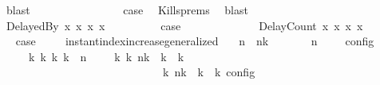 \begin{isabellebody}
\ blast\isanewline
\ \ \ \ \ \ \isamarkupfalse%
\isanewline
\ \ \ \ \ \ \isamarkupfalse%
\ \isamarkupfalse%
\ {\isacharquery}case\ \isamarkupfalse%
\ Kills{\isachardot}prems{\isacharparenleft}{}{\isacharparenright}\ \isamarkupfalse%
\ blast\isanewline
\ \ \ \ \isamarkupfalse%
\isanewline
\ \ \ \ \ \ \isamarkupfalse%
\ {\isacharparenleft}DelayedBy\ x{}\ x{}\ x{}\ x{}{\isacharparenright}\isanewline
\ \ \ \ \ \ \isamarkupfalse%
\ \isamarkupfalse%
\ {\isacharquery}case\ \isamarkupfalse%
\isanewline
\ \ \ \ \isamarkupfalse%
\isanewline
\ \ \ \ \ \ \isamarkupfalse%
\ {\isacharparenleft}DelayCount\ x{}\ x{}\ x{}\ x{}{\isacharparenright}\isanewline
\ \ \ \ \ \ \isamarkupfalse%
\ \isamarkupfalse%
\ {\isacharquery}case\ \isamarkupfalse%
\isanewline
\isanewline
\ \ \isamarkupfalse%
\isanewline
{}\isamarkupfalse%
%
\endisatagproof
{\isafoldproof}%
%
\isadelimproof
\isanewline
%
\endisadelimproof
\isanewline
{}\isamarkupfalse%
\ instant{\isacharunderscore}index{\isacharunderscore}increase{\isacharunderscore}generalized{\isacharcolon}\isanewline
\ \ \ {\isacartoucheopen}n\ {\isacharless}\ n\isactrlsub k{\isacartoucheclose}\isanewline
\ \ \ {\isacartoucheopen}{\isasymrho}\ {\isasymin}\ {\isasymlbrakk}\ {\isasymGamma}{\isacharcomma}\ n\ {\isasymturnstile}\ {\isasymPsi}\ {\isasymtriangleright}\ {\isasymPhi}\ {\isasymrbrakk}\isactrlsub c\isactrlsub o\isactrlsub n\isactrlsub f\isactrlsub i\isactrlsub g{\isacartoucheclose}\isanewline
\ \ \ \ \ {\isacartoucheopen}{\isasymexists}{\isasymGamma}\isactrlsub k\ {\isasymPsi}\isactrlsub k\ {\isasymPhi}\isactrlsub k\ k{\isachardot}\ {\isacharparenleft}{\isacharparenleft}{\isasymGamma}{\isacharcomma}\ n\ {\isasymturnstile}\ {\isasymPsi}\ {\isasymtriangleright}\ {\isasymPhi}{\isacharparenright}\ {\isasymhookrightarrow}\isactrlbsup k\isactrlesup \ {\isacharparenleft}{\isasymGamma}\isactrlsub k{\isacharcomma}\ n\isactrlsub k\ {\isasymturnstile}\ {\isasymPsi}\isactrlsub k\ {\isasymtriangleright}\ {\isasymPhi}\isactrlsub k{\isacharparenright}{\isacharparenright}\isanewline
\ \ \ \ \ \ \ \ \ \ \ \ \ \ \ \ \ \ \ \ \ \ \ \ \ {\isasymand}\ {\isasymrho}\ {\isasymin}\ {\isasymlbrakk}\ {\isasymGamma}\isactrlsub k{\isacharcomma}\ n\isactrlsub k\ {\isasymturnstile}\ {\isasymPsi}\isactrlsub k\ {\isasymtriangleright}\ {\isasymPhi}\isactrlsub k\ {\isasymrbrakk}\isactrlsub c\isactrlsub o\isactrlsub n\isactrlsub f\isactrlsub i\isactrlsub g{\isacartoucheclose}\isanewline

\end{isabellebody}
